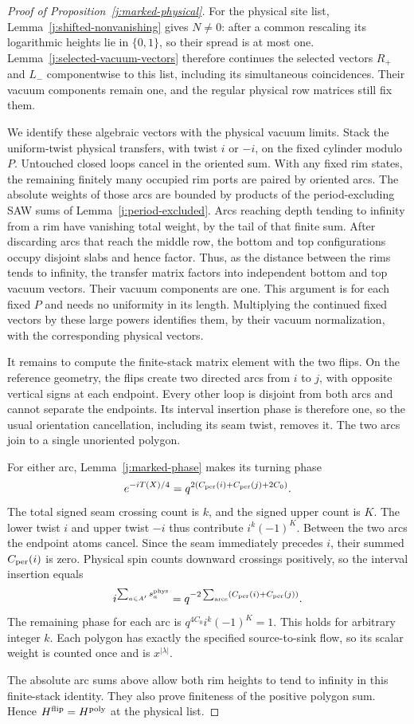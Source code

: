 \begin{proof}[Proof of Proposition~\ref{j:marked-physical}]
For the physical site list, Lemma~\ref{j:shifted-nonvanishing}
gives $N\ne0$: after a common rescaling its logarithmic heights lie in
$\{0,1\}$, so their spread is at most one. Lemma~\ref{j:selected-vacuum-vectors} therefore
continues the selected vectors $R_+$ and $L_-$ componentwise to
this list, including its simultaneous coincidences. Their vacuum
components remain one, and the regular physical row matrices still
fix them.

We identify these algebraic vectors with the physical vacuum
limits. Stack the uniform-twist physical transfers, with twist
$i$ or $-i$, on the fixed cylinder modulo $P$. Untouched closed
loops cancel in the oriented sum. With any fixed rim states, the
remaining finitely many occupied rim ports are paired by oriented
arcs. The absolute weights of those arcs are bounded by products
of the period-excluding SAW sums of
Lemma~\ref{j:period-excluded}. Arcs reaching depth tending to
infinity from a rim have vanishing total weight, by the tail of
that finite sum. After discarding arcs that reach the middle row,
the bottom and top configurations occupy disjoint slabs and hence
factor. Thus, as the distance between the rims tends to infinity,
the transfer matrix factors into independent bottom and top vacuum
vectors. Their vacuum components are one. This
argument is for each fixed $P$ and needs no uniformity in its
length. Multiplying the continued fixed vectors by these large
powers identifies them, by their vacuum normalization, with the
corresponding physical vectors.

It remains to compute the finite-stack matrix element with the two
flips. On the reference geometry, the flips create two directed
arcs from $i$ to $j$, with opposite vertical signs at each
endpoint. Every other loop is disjoint from both arcs and cannot
separate the endpoints. Its interval insertion phase is therefore
one, so the usual orientation cancellation, including its seam
twist, removes it. The two arcs join to a single unoriented polygon.

For either arc, Lemma~\ref{j:marked-phase} makes its turning phase
\[
 e^{-iT(X)/4}
 =q^{2(C_{\rm per}(i)+C_{\rm per}(j)+2C_0)}.
\]
The total signed seam crossing count is $k$, and the signed upper
count is $K$. The lower twist $i$ and upper twist $-i$ thus
contribute $i^k(-1)^K$. Between the two arcs the endpoint atoms
cancel. Since the seam immediately precedes $i$, their summed
$C_{\rm per}(i)$ is zero. Physical spin counts downward crossings
positively, so the interval insertion equals
\[
 i^{\sum_{a\in A'}s_a^{\rm phys}}
 =q^{-2\sum_{\rm arcs}(C_{\rm per}(i)+C_{\rm per}(j))}.
\]
The remaining phase for each arc is
$q^{4C_0}i^k(-1)^K=1$. This holds for arbitrary integer $k$.
Each polygon has exactly the specified source-to-sink flow, so
its scalar weight is counted once and is $x^{|\lambda|}$.

The absolute arc sums above allow both rim heights to tend to
infinity in this finite-stack identity. They also prove finiteness
of the positive polygon sum. Hence
$H^{\rm flip}=H^{\rm poly}$ at the physical list.
\end{proof}

